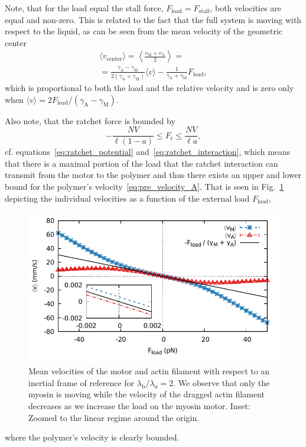 \documentclass[aps,pre,twocolumn,showpacs,showkeys,superscriptaddress,floatfix]{revtex4-1}
\begin{document}
Note, that for the load equal the stall force, $F_\text{load} = F_\text{stall}$, both velocities are equal and non-zero.
This is related to the fact that the full system is moving with respect to the liquid, as can be seen from the mean velocity of the geometric center 
\begin{multline*}
\langle v_\text{center} \rangle = \left\langle \frac{ v_\text{M} + v_\text{A} }{2} \right\rangle 
= \\
= \frac{ \gamma_\text{A} - \gamma_\text{M} }{ 2 ( \gamma_\text{A} + \gamma_\text{M} ) } \langle v \rangle - \frac{1}{ \gamma_\text{A} + \gamma_\text{M} } F_\text{load}
, 
\end{multline*}
which is proportional to both the load and the relative velocity and is zero only when $\langle v \rangle = 2 F_\text{load} / ( \gamma_\text{A} - \gamma_\text{M} )$.

Also note, that the ratchet force is bounded by 
\begin{equation}
- \frac{ N V }{ \ell (1-a) } 
\le 
F_\text{r}
\le
\frac{ N V }{ \ell a } ,
\label{eq:ratchet_force_bounds}
\end{equation}
cf. equations~\eqref{eq:ratchet_potential} and~\eqref{eq:ratchet_interaction}, 
which means that there is a maximal portion of the load that the ratchet interaction can transmit from the motor to the polymer 
and thus there exists an upper and lower bound for the polymer's velocity~\eqref{eq:pre_velocity_A}.   
That is seen in Fig.~\ref{fig:ind_v} depicting the individual velocities as a function of the external load $F_\text{load}$,  
\begin{figure}[t]
\centering
\includegraphics[width=0.9\linewidth,height=!]{individual_velocities}
\caption{
\label{fig:ind_v} 
Mean velocities of the motor and actin filament with respect to an inertial frame of reference for $\lambda_\text{b}/\lambda_\text{u} = 2$.
We observe that only the myosin is moving while the velocity of the dragged actin filament decreases as we increase the load on the myosin motor.
Inset: Zoomed to the linear regime around the origin.
}
\end{figure}
where the polymer's velocity is clearly bounded. 
\end{document}

